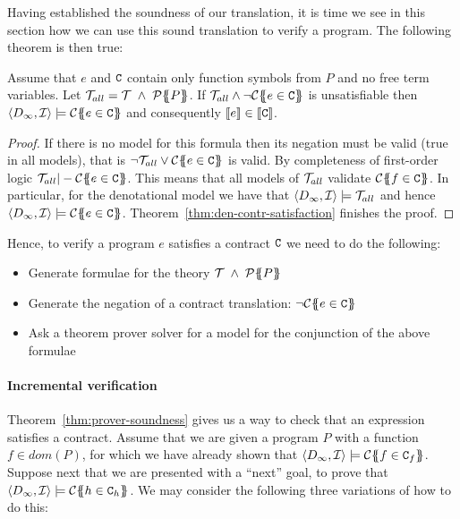 Having established the soundness of our translation, it is time
we see in this section how we can use this sound translation to verify a program.
The following theorem is then true:

\begin{theorem}[Soundness]\label{thm:prover-soundness}
Assume that $e$ and $\Ct$ contain only function symbols from $P$ and no free term variables.
Let $\Th_{all} = \Th\;\land\;\ptrans{}{P}$.
If $\Th_{all} \land \neg\ctrans{\Sigma}{P}{e \in \Ct}$ is unsatisfiable
then $\langle D_\infty,{\cal I}\rangle \models \ctrans{\Sigma}{P}{e \in \Ct}$ and
consequently $\dbrace{e} \in \dbrace{\Ct}$.
\end{theorem}
\begin{proof}
If there is no model for this formula then its negation must be valid (true in all models), that
is $ \neg \Th_{all} \lor \ctrans{\Sigma}{P}{e \in \Ct}$ is valid. By completeness
of first-order logic $\Th_{all} |- \ctrans{\Sigma}{P}{e \in \Ct}$. This means
that all models of $\Th_{all}$ validate $\ctrans{\Sigma}{P}{f \in \Ct}$. In particular,
for the denotational model we have that $\langle D_\infty,{\cal I}\rangle \models \Th_{all}$
and hence $\langle D_\infty,{\cal I} \rangle \models \ctrans{\Sigma}{P}{e \in \Ct}$.
Theorem~\ref{thm:den-contr-satisfaction} finishes the proof.
\end{proof}

Hence, to verify a program $e$ satisfies a contract $\Ct$ we need to do the following:
\begin{itemize}
  \item Generate formulae for the theory $\Th\;\land\;\ptrans{}{P}$
  \item Generate the negation of a contract translation: $\neg\ctrans{\Sigma}{P}{e \in \Ct}$
  \item Ask a theorem prover solver for a model for the conjunction of the above formulae
\end{itemize}

\paragraph{Incremental verification}

Theorem~\ref{thm:prover-soundness} gives us a way to check that an expression satisfies a
contract. Assume that we are given a program $P$ with a function $f \in dom(P)$, for which
we have already shown that $\langle D_\infty,{\cal I}\rangle \models \ctrans{\Sigma}{P}{f \in \Ct_f}$.
Suppose next that we are presented with a ``next'' goal, to prove that
$\langle D_\infty,{\cal I}\rangle \models \ctrans{\Sigma}{P}{h \in \Ct_h}$.
We may consider the following three variations of how to do this:


